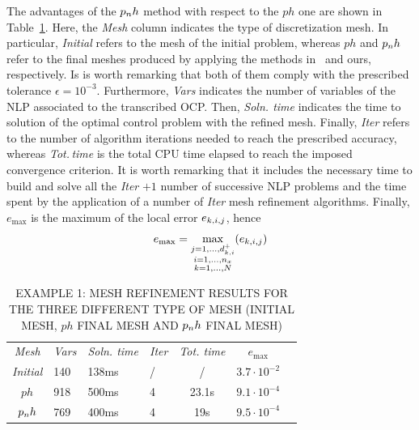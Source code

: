 The advantages of the $p_{n}h$ method with respect to the $ph$ one are shown in Table~\ref{tab:tablevanderpol}. Here, the \emph{Mesh} column indicates the type of discretization mesh. In particular, \emph{Initial} refers to the mesh of the initial problem, whereas $ph$ and $p_{n}h$ refer to the final meshes produced by applying the methods in~\cite{Patterson:OCAM:2015} and ours, respectively. Is is worth remarking that both of them comply with the prescribed tolerance $\epsilon=10^{-3}$. Furthermore, \emph{Vars} indicates the number of variables of the NLP associated to the transcribed OCP. Then, \emph{Soln. time} indicates the time to solution of the optimal control problem with the refined mesh. Finally, \emph{Iter} refers to the number of algorithm iterations needed to reach the prescribed accuracy, whereas \emph{Tot.\,time} is the total CPU time elapsed to reach the imposed convergence criterion. It is worth remarking that it includes the necessary time to build and solve all the \emph{Iter} $+1$ number of successive NLP problems and the time spent by the application of a number of \emph{Iter} mesh refinement algorithms. Finally, $e_{\max}$  is the maximum of the local error $e_{k,i,j}$, hence
\begin{equation}
e_\text{max}= \max\limits_{\substack{j = 1, \dots, d_{k,i}^{+} \\ i = 1, \dots, n_x \\ k = 1, \dots, N}} (e_{k,i,j})
\end{equation}
\begin{table}[t]
	\caption{EXAMPLE 1: MESH REFINEMENT RESULTS FOR THE THREE DIFFERENT TYPE OF MESH (INITIAL MESH, $ph$ FINAL MESH AND $p_{n}h$ FINAL MESH)}
	\begin{center}
		\label{tab:tablevanderpol}
		\begin{tabular}{c l l l c c c}
			& & \\ %
			\hline
			\emph{Mesh} & \emph{Vars} & \emph{Soln. time} & \emph{Iter} & \emph{Tot. time} & $e_\text{max}$ \\
			\hline
			\emph{Initial} & 140 & 138ms & / & / &  $3.7\cdot 10^{-2}$\\
			$ph$ & 918 & 500ms & 4 & 23.1s & $9.1\cdot 10^{-4}$ \\
			$p_{n}h$ & 769 & 400ms & 4 & 19s & $9.5\cdot 10^{-4}$ \\
			\hline
		\end{tabular}
	\end{center}
\end{table}
